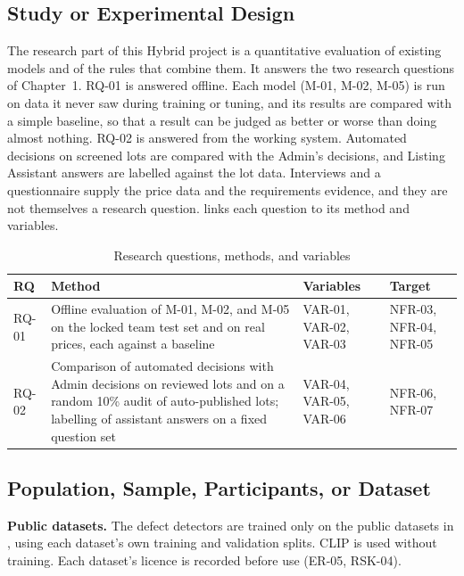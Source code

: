\subsection{Study or Experimental Design}
The research part of this Hybrid project is a quantitative evaluation of existing
models and of the rules that combine them. It answers the two research questions of
Chapter~1. RQ-01 is answered offline. Each model (M-01, M-02, M-05) is run on data it
never saw during training or tuning, and its results are compared with a simple
baseline, so that a result can be judged as better or worse than doing almost
nothing. RQ-02 is answered from the working system. Automated decisions on screened lots
are compared with the Admin's decisions, and Listing Assistant answers are labelled
against the lot data. Interviews and a questionnaire supply the price data and the
requirements evidence, and they are not themselves a research question.
 links each question to its method and variables.

\begin{table}[H]
\centering
\caption{Research questions, methods, and variables}
\label{tab:rq-method}
\footnotesize
\begin{tabularx}{\textwidth}{@{}p{}Xp{}p{}@{}}
\toprule
\textbf{RQ} & \textbf{Method} & \textbf{Variables} & \textbf{Target} \\
\midrule
RQ-01 & Offline evaluation of M-01, M-02, and M-05 on the locked team test set and on real prices, each against a baseline & VAR-01, VAR-02, VAR-03 & NFR-03, NFR-04, NFR-05 \\
RQ-02 & Comparison of automated decisions with Admin decisions on reviewed lots and on a random 10\% audit of auto-published lots; labelling of assistant answers on a fixed question set & VAR-04, VAR-05, VAR-06 & NFR-06, NFR-07 \\
\bottomrule
\end{tabularx}
\end{table}

\subsection{Population, Sample, Participants, or Dataset}
\textbf{Public datasets.} The defect detectors are trained only on the public datasets
in , using each dataset's own training and validation splits.
CLIP is used without training. Each dataset's licence is recorded before use (ER-05,
RSK-04).

